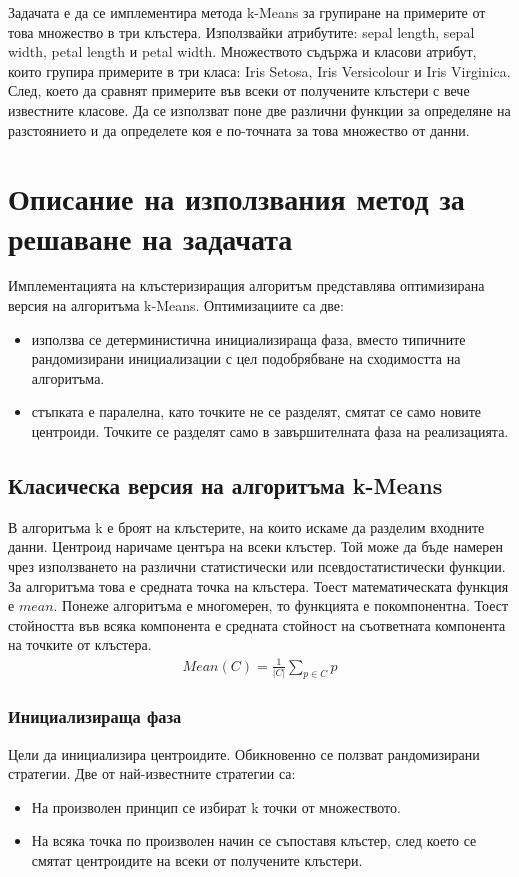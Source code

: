 \documentclass[a4paper, 12pt]{article}
\begin{document}
Задачата е да се имплементира метода k-Means за групиране на примерите от това
множество в три клъстера. Използвайки атрибутите:
sepal length, sepal width, petal length и petal width.
Множеството съдържа и класови атрибут, които групира примерите в три класа:
Iris Setosa, Iris Versicolour и Iris Virginica.
След, което да сравнят примерите във всеки от получените клъстери с вече известните класове.
Да се използват поне две различни функции за определяне на разстоянието и да определете
коя е по-точната за това множество от данни. 
\section{Описание на използвания метод за решаване на задачата}
Имплементацията на клъстеризиращия алгоритъм представлява оптимизирана версия на алгоритъма k-Means.
Оптимизациите са две:
\begin{itemize}
\item използва се детерминистична инициализираща фаза, вместо типичните рандомизирани инициализации с цел подобрябване на сходимостта на алгоритъма.
\item стъпката е паралелна, като точките не се разделят, смятат се само новите центроиди. Точките се разделят само в завършителната фаза на реализацията.
\end{itemize}
\subsection{Класическа версия на алгоритъма k-Means}
В алгоритъма k е броят на клъстерите, на които искаме да разделим входните данни.
Центроид наричаме центъра на всеки клъстер. Той може да бъде намерен чрез използването на различни статистически или псевдостатистически функции.
За алгоритъма това е средната точка на клъстера. Тоест математическата функция е \(mean\).
Понеже алгоритъма е многомерен, то функцията е покомпонентна. Тоест стойността във всяка компонента е средната стойност на съответната компонента на точките от клъстера.
\begin{align*}
    Mean(C) = \displaystyle\frac{1}{|C|} \displaystyle\sum_{p \in C} p
\end{align*}
\subsubsection{Инициализираща фаза}
Цели да инициализира центроидите.
Обикновенно се ползват рандомизирани стратегии.
Две от най-известните стратегии са:
\begin{itemize}
\item На произволен принцип се избират k точки от множеството.
\item На всяка точка по произволен начин се съпоставя клъстер,
след което се смятат центроидите на всеки от получените клъстери.
\end{itemize}
\end{document}

